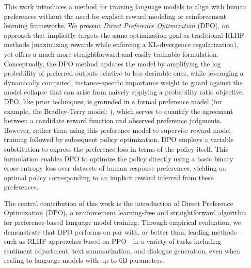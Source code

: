 This work introduces a method for training language models to align with human preferences without the need for explicit reward modeling or reinforcement learning frameworks. We present \textit{Direct Preference Optimization} (DPO), an approach that implicitly targets the same optimization goal as traditional RLHF methods (maximizing rewards while enforcing a KL-divergence regularization), yet offers a much more straightforward and easily trainable formulation. Conceptually, the DPO method updates the model by amplifying the log probability of preferred outputs relative to less desirable ones, while leveraging a dynamically computed, instance-specific importance weight to guard against the model collapse that can arise from naively applying a probability ratio objective. DPO, like prior techniques, is grounded in a formal preference model (for example, the Bradley-Terry model; \cite{bradley1952rankanalysis}), which serves to quantify the agreement between a candidate reward function and observed preference judgments. However, rather than using this preference model to supervise reward model training followed by subsequent policy optimization, DPO employs a variable substitution to express the preference loss in terms of the policy itself. This formulation enables DPO to optimize the policy directly using a basic binary cross-entropy loss over datasets of human response preferences, yielding an optimal policy corresponding to an implicit reward inferred from these preferences.

The central contribution of this work is the introduction of Direct Preference Optimization (DPO), a reinforcement learning-free and straightforward algorithm for preference-based language model training. Through empirical evaluation, we demonstrate that DPO performs on par with, or better than, leading methods—such as RLHF approaches based on PPO—in a variety of tasks including sentiment adjustment, text summarization, and dialogue generation, even when scaling to language models with up to 6B parameters.

